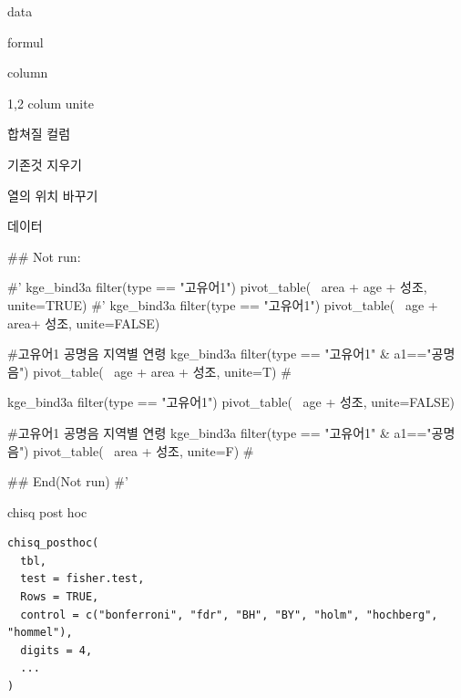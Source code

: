 \documentclass[a4paper]{book}
\begin{document}
\begin{Arguments}
\begin{ldescription}
\item[\code{data}] data

\item[\code{formula}] formul

\item[\code{names\_from}] column

\item[\code{unite}] 1,2 colum unite

\item[\code{col}] 합쳐질 컬럼

\item[\code{remove}] 기존것 지우기

\item[\code{change\_col}] 열의 위치 바꾸기
\end{ldescription}
\end{Arguments}
%
\begin{Value}
데이터
\end{Value}
%
\begin{Examples}
\begin{ExampleCode}

## Not run: 

#' kge_bind3a %
filter(type == "고유어1")%
  pivot_table(~ area + age + 성조, unite=TRUE)
#'
kge_bind3a %
  filter(type == "고유어1")%
  pivot_table(~  age + area+ 성조, unite=FALSE)

#고유어1 공명음  지역별 연령
kge_bind3a %
  filter(type == "고유어1" & a1=="공명음")%
  pivot_table(~ age + area + 성조, unite=T)  #%



kge_bind3a %
  filter(type == "고유어1")%
  pivot_table(~  age +  성조, unite=FALSE)

#고유어1 공명음  지역별 연령
kge_bind3a %
  filter(type == "고유어1" & a1=="공명음")%
  pivot_table(~  area + 성조, unite=F)  #%


  
## End(Not run)
#'

\end{ExampleCode}
\end{Examples}
%
\begin{Description}
chisq post hoc
\end{Description}
%
\begin{Usage}
\begin{verbatim}
chisq_posthoc(
  tbl,
  test = fisher.test,
  Rows = TRUE,
  control = c("bonferroni", "fdr", "BH", "BY", "holm", "hochberg", "hommel"),
  digits = 4,
  ...
)
\end{verbatim}
\end{Usage}
\end{document}
